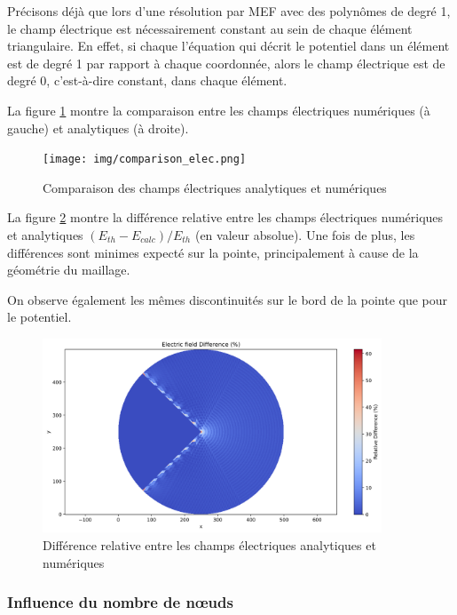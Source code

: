 \documentclass{article}
\begin{document}
Précisons déjà que lors d'une résolution par MEF avec des polynômes
de degré 1, le champ électrique est nécessairement constant
au sein de chaque élément triangulaire. En effet, si chaque
l'équation qui décrit le potentiel dans un élément est de degré 1
par rapport à chaque coordonnée, alors le champ électrique
est de degré 0, c'est-à-dire constant, dans chaque élément.

\newpage

La figure \ref{fig:field_comparison} montre la comparaison
entre les champs électriques
numériques (à gauche) et analytiques (à droite).


\begin{figure}[!h]
    \centering
    \texttt{[image: img/comparison\_elec.png]}
    \caption{Comparaison des champs électriques analytiques et numériques}
    \label{fig:field_comparison}
\end{figure}

La figure \ref{fig:field_diff} montre la différence relative entre
les champs électriques numériques et analytiques
$(E_{th} - E_{calc}) / E_{th}$ (en valeur absolue). Une fois
de plus, les différences sont minimes expecté sur la pointe,
principalement à cause de la géométrie du maillage.

On observe également les mêmes discontinuités sur le bord
de la pointe que pour le potentiel.

\begin{figure}[!h]
    \centering
    \includegraphics[width=0.9\textwidth]{img/difference_elec.png}
    \caption{Différence relative entre les champs électriques analytiques et numériques}
    \label{fig:field_diff}
\end{figure}

\newpage

\subsubsection{Influence du nombre de nœuds}
\end{document}
